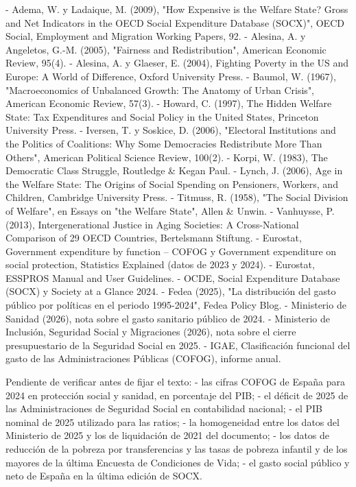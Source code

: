 \documentclass[10pt,a4paper]{article}
\begin{document}
- Adema, W. y Ladaique, M. (2009), "How Expensive is the Welfare State? Gross and Net Indicators in the OECD Social Expenditure Database (SOCX)", OECD Social, Employment and Migration Working Papers, 92.
- Alesina, A. y Angeletos, G.-M. (2005), "Fairness and Redistribution", American Economic Review, 95(4).
- Alesina, A. y Glaeser, E. (2004), Fighting Poverty in the US and Europe: A World of Difference, Oxford University Press.
- Baumol, W. (1967), "Macroeconomics of Unbalanced Growth: The Anatomy of Urban Crisis", American Economic Review, 57(3).
- Howard, C. (1997), The Hidden Welfare State: Tax Expenditures and Social Policy in the United States, Princeton University Press.
- Iversen, T. y Soskice, D. (2006), "Electoral Institutions and the Politics of Coalitions: Why Some Democracies Redistribute More Than Others", American Political Science Review, 100(2).
- Korpi, W. (1983), The Democratic Class Struggle, Routledge & Kegan Paul.
- Lynch, J. (2006), Age in the Welfare State: The Origins of Social Spending on Pensioners, Workers, and Children, Cambridge University Press.
- Titmuss, R. (1958), "The Social Division of Welfare", en Essays on "the Welfare State", Allen & Unwin.
- Vanhuysse, P. (2013), Intergenerational Justice in Aging Societies: A Cross-National Comparison of 29 OECD Countries, Bertelsmann Stiftung.
- Eurostat, Government expenditure by function – COFOG y Government expenditure on social protection, Statistics Explained (datos de 2023 y 2024).
- Eurostat, ESSPROS Manual and User Guidelines.
- OCDE, Social Expenditure Database (SOCX) y Society at a Glance 2024.
- Fedea (2025), "La distribución del gasto público por políticas en el periodo 1995-2024", Fedea Policy Blog.
- Ministerio de Sanidad (2026), nota sobre el gasto sanitario público de 2024.
- Ministerio de Inclusión, Seguridad Social y Migraciones (2026), nota sobre el cierre presupuestario de la Seguridad Social en 2025.
- IGAE, Clasificación funcional del gasto de las Administraciones Públicas (COFOG), informe anual.

Pendiente de verificar antes de fijar el texto:
- las cifras COFOG de España para 2024 en protección social y sanidad, en porcentaje del PIB;
- el déficit de 2025 de las Administraciones de Seguridad Social en contabilidad nacional;
- el PIB nominal de 2025 utilizado para las ratios;
- la homogeneidad entre los datos del Ministerio de 2025 y los de liquidación de 2021 del documento;
- los datos de reducción de la pobreza por transferencias y las tasas de pobreza infantil y de los mayores de la última Encuesta de Condiciones de Vida;
- el gasto social público y neto de España en la última edición de SOCX.
\end{document}
